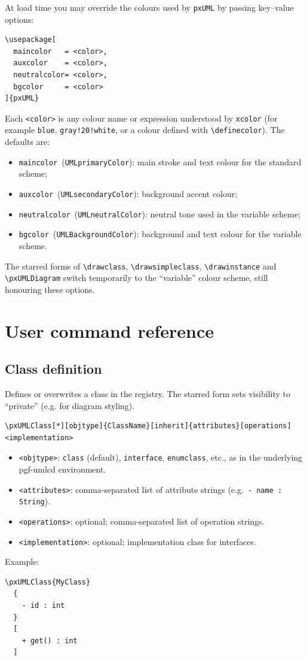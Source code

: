\documentclass[11pt,a4paper]{article}
\begin{document}
At load time you may override the colours used by \texttt{pxUML} by passing
key--value options:
\begin{verbatim}
\usepackage[
  maincolor   = <color>,
  auxcolor    = <color>,
  neutralcolor= <color>,
  bgcolor     = <color>
]{pxUML}
\end{verbatim}
Each \texttt{<color>} is any colour name or expression understood by
\texttt{xcolor} (for example \texttt{blue}, \texttt{gray!20!white}, or a
colour defined with \texttt{\textbackslash definecolor}). The defaults are:
\begin{itemize}
  \item \texttt{maincolor}~(\verb|UMLprimaryColor|): main stroke and text
    colour for the standard scheme;
  \item \texttt{auxcolor}~(\verb|UMLsecondaryColor|): background accent colour;
  \item \texttt{neutralcolor}~(\verb|UMLneutralColor|): neutral tone used in
    the variable scheme;
  \item \texttt{bgcolor}~(\verb|UMLBackgroundColor|): background and text
    colour for the variable scheme.
\end{itemize}
The starred forms of \verb|\drawclass|, \verb|\drawsimpleclass|,
\verb|\drawinstance| and \verb|\pxUMLDiagram| switch temporarily to the
``variable'' colour scheme, still honouring these options.

\section{User command reference}
\label{sec:api}

\subsection{Class definition}

\DescribeMacro{\pxUMLClass}
Defines or overwrites a class in the registry. The starred form sets visibility
to ``private'' (e.g. for diagram styling).
\begin{verbatim}
\pxUMLClass[*][objtype]{ClassName}[inherit]{attributes}[operations]<implementation>
\end{verbatim}
\begin{itemize}
  \item \texttt{<objtype>}: \texttt{class} (default), \texttt{interface},
    \texttt{enumclass}, etc., as in the underlying pgf-umlcd environment.
  \item \texttt{<attributes>}: comma-separated list of attribute strings
    (e.g.\ \texttt{- name : String}).
  \item \texttt{<operations>}: optional; comma-separated list of operation
    strings.
  \item \texttt{<implementation>}: optional; implementation class for interfaces.
\end{itemize}
Example:
\begin{verbatim}
\pxUMLClass{MyClass}
  {
    - id : int
  }
  [
    + get() : int
  ]
\end{verbatim}
\end{document}
